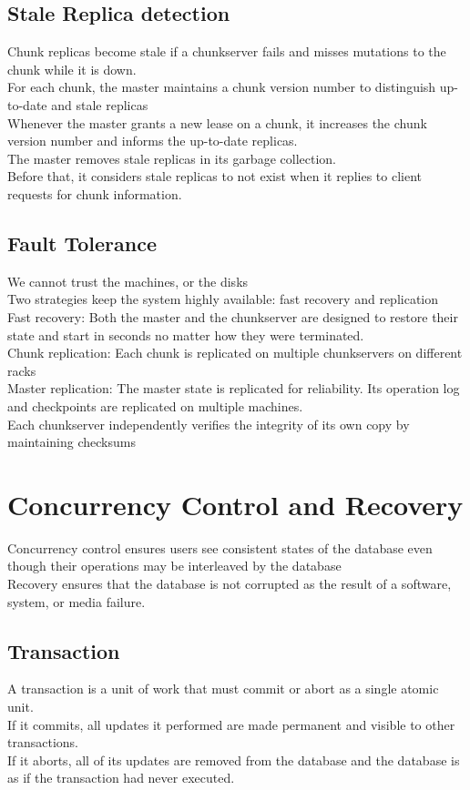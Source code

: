 \subsection{Stale Replica detection}
Chunk replicas become stale if a chunkserver fails and misses mutations to the chunk while it is down.\\
For each chunk, the master maintains a chunk version number to distinguish up-to-date and stale replicas\\
Whenever the master grants a new lease on a chunk, it increases the chunk version number and informs the up-to-date replicas.\\
The master removes stale replicas in its garbage collection. \\
Before that, it considers stale replicas to not exist when it replies to client requests for chunk information.
\subsection{Fault Tolerance}
We cannot trust the machines, or the disks\\
Two strategies keep the system highly available: fast recovery and replication\\
Fast recovery: Both the master and the chunkserver are designed to restore their state and start in seconds no matter how they were terminated.\\
Chunk replication: Each chunk is replicated on multiple chunkservers on different racks\\
Master replication: The master state is replicated for reliability. Its operation log and checkpoints are replicated on multiple machines.\\
Each chunkserver independently verifies the integrity of its own copy by maintaining checksums

\section{Concurrency Control and Recovery}
Concurrency control ensures users see consistent states of the database even though their operations may be interleaved by the database\\
Recovery ensures that the database is not corrupted as the result of a software, system, or media failure.
\subsection{Transaction}
A transaction is a unit of work that must commit or abort as a single atomic unit. \\
If it commits, all updates it performed are made permanent and visible to other transactions. \\
If it aborts, all of its updates are removed from the database and the database is as if the transaction had never executed.\\
\\
